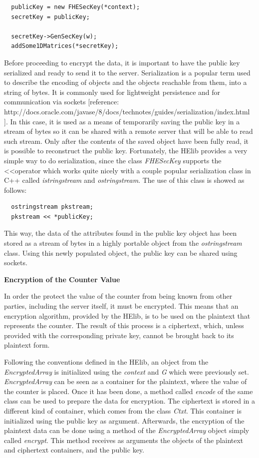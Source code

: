 \begin{lstlisting}
  publicKey = new FHESecKey(*context);
  secretKey = publicKey;

  secretKey->GenSecKey(w); 
  addSome1DMatrices(*secretKey); 
\end{lstlisting}

Before proceeding to encrypt the data, it is important to have the public key serialized and ready to send it to the server. Serialization is a popular term used to describe the encoding of objects and the objects reachable from them, into a string of bytes. It is commonly used for lightweight persistence and for communication via sockets 
[reference: http://docs.oracle.com/javase/8/docs/technotes/guides/serialization/index.html ]. In this case, it is used as a means of temporarily saving the public key in a stream of bytes so it can be shared with a remote server that will be able to read such stream. Only after the contents of the saved object have been fully read, it is possible to reconstruct the public key. Fortunately, the HElib provides a very simple way to do serialization, since the class 
\textit{FHESecKey} supports the \textless\textless operator which works quite nicely with a couple popular serialization class in C++ called \textit{istringstream} and \textit{ostringstream}. The use of this class is showed as follows: 


\begin{lstlisting}
  ostringstream pkstream;
  pkstream << *publicKey;
\end{lstlisting}


This way, the data of the attributes found in the public key object has been stored as a stream of bytes in a highly portable object from the \textit{ostringstream} class. Using this newly populated object, the public key can be shared using sockets.

\textbf{Encryption of the Counter Value}

In order the protect the value of the counter from being known from other parties, including the server itself, it must be encrypted. This means that an encryption algorithm, provided by the HElib, is to be used on the plaintext that represents the counter. The result of this process is a ciphertext, which, unless provided with the corresponding private key, cannot be brought back to its plaintext form. 

Following the conventions defined in the HElib, an object from the \textit{EncryptedArray} is initialized using the \textit{context} and \textit{G} which were previously set. \textit{EncryptedArray} can be seen as a container for the plaintext, where the value of the counter is placed. Once it has been done, a method called \textit{encode} of the same class can be used to prepare the data for encryption. The ciphertext is stored in a different kind of container, which comes from the class \textit{Ctxt}. This container is initialized using the public key as argument. Afterwards, the encryption of the plaintext data can be done using a method of the \textit{EncryptedArray} object simply called \textit{encrypt}. This method receives as arguments the objects of the plaintext and ciphertext containers, and the public key.

